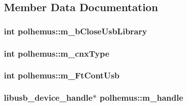 \subsection{Member Data Documentation}
\hypertarget{classpolhemus_abef43154f424514211a4ad8f310ace0e}{
\subsubsection[{m\-\_\-b\-Close\-Usb\-Library}]{\setlength{\rightskip}{0pt plus 5cm}int polhemus\-::m\-\_\-b\-Close\-Usb\-Library\hspace{0.3cm}{\ttfamily [private]}}}\label{classpolhemus_abef43154f424514211a4ad8f310ace0e}
\hypertarget{classpolhemus_a3e2758afd02358a10b1b3fc670f2b4ac}{
\subsubsection[{m\-\_\-cnx\-Type}]{\setlength{\rightskip}{0pt plus 5cm}int polhemus\-::m\-\_\-cnx\-Type\hspace{0.3cm}{\ttfamily [private]}}}\label{classpolhemus_a3e2758afd02358a10b1b3fc670f2b4ac}
\hypertarget{classpolhemus_a481e90e59c2339e2ee06d7037ffd7e9d}{
\subsubsection[{m\-\_\-\-Ft\-Cont\-Usb}]{\setlength{\rightskip}{0pt plus 5cm}int polhemus\-::m\-\_\-\-Ft\-Cont\-Usb\hspace{0.3cm}{\ttfamily [private]}}}\label{classpolhemus_a481e90e59c2339e2ee06d7037ffd7e9d}
\hypertarget{classpolhemus_a0b6dd21dabb3c31007636ad25d4d12fe}{
\subsubsection[{m\-\_\-handle}]{\setlength{\rightskip}{0pt plus 5cm}libusb\-\_\-device\-\_\-handle$\ast$ polhemus\-::m\-\_\-handle\hspace{0.3cm}{\ttfamily [private]}}}\label{classpolhemus_a0b6dd21dabb3c31007636ad25d4d12fe}
